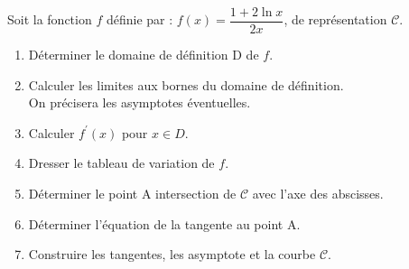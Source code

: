   
   \begin{exercice}

 Soit la fonction $ f $ définie par : $ f(x)=\dfrac{1+2\ln x}{2x} $, de  représentation $ \mathscr{C} $.
 \begin{enumerate} 
 \item Déterminer  le domaine de définition  D de $ f $. 
 \item Calculer les limites aux bornes du domaine de définition. \\On précisera les asymptotes éventuelles.
 \item Calculer   $ f^{\prime}(x)$  pour $ x\in D $.
  \item Dresser le tableau de variation de $ f. $
   \item Déterminer le point   A intersection de $ \mathscr{C} $ avec l'axe des abscisses.
   \item Déterminer l'équation de la tangente au point A.
  \item Construire  les tangentes, les asymptote et la courbe $ \mathscr{C} $.
 \end{enumerate}
  \end{exercice}


